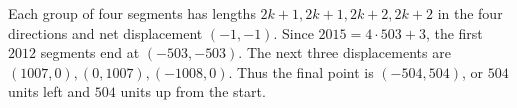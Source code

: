 Each group of four segments has lengths $2k+1,2k+1,2k+2,2k+2$ in the four directions and net displacement $(-1,-1)$. Since $2015=4\cdot503+3$, the first $2012$ segments end at $(-503,-503)$. The next three displacements are $(1007,0),(0,1007),(-1008,0)$. Thus the final point is $\boxed{(-504,504)}$, or $504$ units left and $504$ units up from the start.
